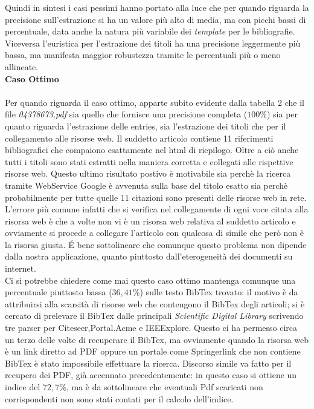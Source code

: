 Quindi in sintesi i casi pessimi hanno portato alla luce che per quando riguarda la precisione sull'estrazione si ha un valore più alto di media, ma con picchi bassi di percentuale, data anche la natura più variabile dei \textit{template} per le bibliografie. Viceversa l'euristica per l'estrazione dei titoli ha una precisione leggermente più bassa, ma manifesta maggior robustezza tramite le percentuali più o meno allineate.\\

\textbf{Caso Ottimo}\\
~\\
Per quando riguarda il caso ottimo, apparte subito evidente dalla tabella 2 che il file \textit{04378673.pdf} sia quello che fornisce una precisione completa ($100\%$) sia per quanto riguarda l'estrazione delle entries, sia l'estrazione dei titoli che per il collegamento alle risorse web. Il suddetto articolo contiene 11 riferimenti bibliografici che compaiono esattamente nel html di riepilogo. Oltre a ciò anche tutti i titoli sono stati estratti nella maniera corretta e collegati alle rispettive risorse web. Questo ultimo risultato postivo è motivabile sia perchè la ricerca tramite WebService Google è avvenuta sulla base del titolo esatto sia perchè probabilmente per tutte quelle 11 citazioni sono presenti delle risorse web in rete. L'errore più comune infatti che si verifica nel collegamente di ogni voce citata alla risorsa web è che a volte non vi è un risorsa web relativa al suddetto articolo e ovviamente si procede a collegare l'articolo con qualcosa di simile che però non è la risorsa giusta. \'E bene sottolineare che comunque questo problema non dipende dalla nostra applicazione, quanto piuttosto dall'eterogeneità dei documenti su internet.\\

Ci si potrebbe chiedere come mai questo caso ottimo mantenga comunque una percentuale piuttosto bassa ($36,41\%$) sulle testo BibTex trovato: il motivo è da attribuirsi alla scarsità di risorse web che contengono il BibTex degli articoli; si è cercato di prelevare il BibTex dalle principali \textit{Scientific Digital Library} scrivendo tre parser per Citeseer,Portal.Acme e IEEExplore. Questo ci ha permesso circa un terzo delle volte di recuperare il BibTex, ma ovviamente quando la risorsa web è un link diretto ad PDF oppure un portale come Springerlink che non contiene BibTex è stato impossibile effettuare la ricerca. Discorso simile va fatto per il recupero dei PDF, già accennato precedentemente: in questo caso si ottiene un indice del $72,7\%$, ma è da sottolineare che eventuali Pdf scaricati non corrispondenti non sono stati contati per il calcolo dell'indice.


